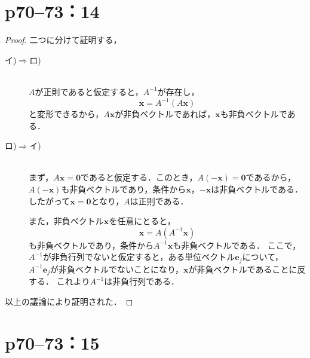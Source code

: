 \documentclass[a4paper,10pt,fleqn]{ltjsarticle}
\begin{document}
\newpage


\section*{p70--73：14}

\begin{leftbar}
  \begin{proof}
    二つに分けて証明する，
    \begin{description}
      \item[イ)$\Longrightarrow$ロ)] \mbox{} \\
            $A$が正則であると仮定すると，$A^{-1}$が存在し，
            \[
              \bm{x} = A^{-1} (A\bm{x})
            \]
            と変形できるから，$A \bm{x}$が非負ベクトルであれば，$\bm{x}$も非負ベクトルである．
      \item[ロ)$\Longrightarrow$イ)] \mbox{} \\
            まず，$ A \bm{x} =\bm{0}$であると仮定する．このとき，$A (-\bm{x}) =\bm{0}$であるから，
            $A (-\bm{x})$も非負ベクトルであり，条件から$ \bm{x}$，$-\bm{x}$は非負ベクトルである．
            したがって$\bm{x}=\bm{0}$となり，$A$は正則である．

            また，非負ベクトル$\bm{x}$を任意にとると，
            \[
              \bm{x} = A (A^{-1} \bm{x})
            \]
            も非負ベクトルであり，条件から$A^{-1} \bm{x}$も非負ベクトルである．
            ここで，$A^{-1}$が非負行列でないと仮定すると，ある単位ベクトル$\bm{e}_j$について，
            $A^{-1} \bm{e}_j $が非負ベクトルでないことになり，$\bm{x}$が非負ベクトルであることに反する．
            これより$A^{-1}$は非負行列である．
    \end{description}
    以上の議論により証明された．
  \end{proof}
\end{leftbar}


\newpage



\section*{p70--73：15}
\end{document}

